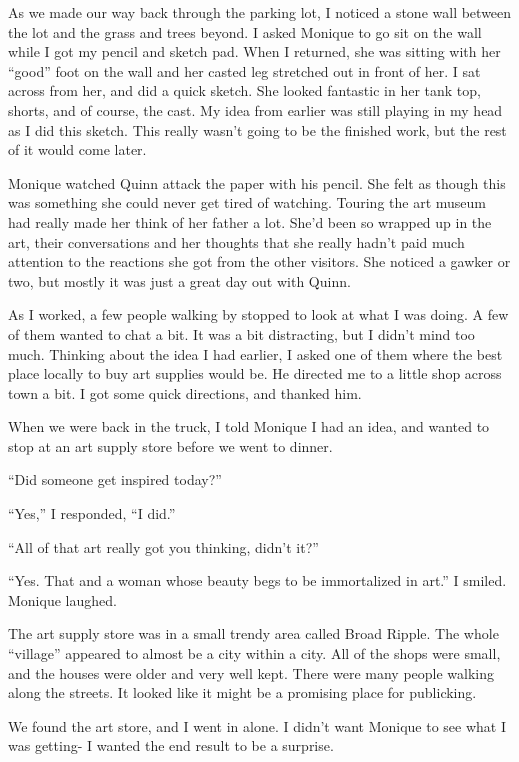 As we made our way back through the parking lot, I noticed a stone wall between the lot and
the grass and trees beyond. I asked Monique to go sit on the wall while I got my pencil and
sketch pad. When I returned, she was sitting with her ``good'' foot on the wall and her casted
leg
stretched out in front of her. I sat across from her, and did a quick sketch. She looked
fantastic in her tank top, shorts, and of course, the cast. My idea from earlier was still
playing in my head as I did this sketch. This really wasn't going to be the finished work, but
the rest of it would come later.

\begin{thought}
Monique watched Quinn attack the paper with his pencil. She felt as though this was
something she could never get tired of watching. Touring the art museum had really made her
think of her father a lot. She'd been so wrapped up in the art, their conversations and her
thoughts that she really hadn't paid much attention to the reactions she got from the other
visitors. She noticed a gawker or two, but mostly it was just a great day out with Quinn.
\end{thought}

As I worked, a few people walking by stopped to look at what I was doing. A few of them
wanted to chat a bit. It was a bit distracting, but I didn't mind too much. Thinking about the
idea I had earlier, I asked one of them where the best place locally to buy art supplies would
be. He directed me to a little shop across town a bit. I got some quick directions, and thanked
him.

When we were back in the truck, I told Monique I had an idea, and wanted to stop at an art
supply store before we went to dinner.

``Did someone get inspired today?''

``Yes,'' I responded, ``I did.''

``All of that art really got you thinking, didn't it?''

``Yes. That and a woman whose beauty begs to be immortalized in art.'' I smiled. Monique
laughed.

The art supply store was in a small trendy area called Broad Ripple. The whole ``village''
appeared to almost be a city within a city. All of the shops were small, and the houses were
older and very well kept. There were many people walking along the streets. It looked like it
might be a promising place for publicking.

We found the art store, and I went in alone. I didn't want Monique to see what I was
getting- I wanted the end result to be a surprise.

